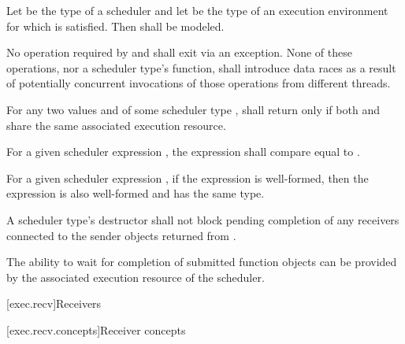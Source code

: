 \pnum
Let  be the type of a scheduler and
let  be the type of an execution environment
for which 
is satisfied.
Then 
shall be modeled.

\pnum
No operation required by
 and
shall exit via an exception.
None of these operations,
nor a scheduler type's  function,
shall introduce data races
as a result of potentially concurrent invocations
of those operations from different threads.

\pnum
For any two values  and 
of some scheduler type ,
 shall return 
only if both  and  share
the same associated execution resource.

\pnum
For a given scheduler expression ,
the expression
shall compare equal to .

\pnum
For a given scheduler expression ,
if the expression  is well-formed,
then the expression 
is also well-formed and has the same type.

\pnum
A scheduler type's destructor shall not block
pending completion of any receivers
connected to the sender objects returned from .
\begin{note}
The ability to wait for completion of submitted function objects
can be provided by the associated execution resource of the scheduler.
\end{note}

[exec.recv]{Receivers}

[exec.recv.concepts]{Receiver concepts}

